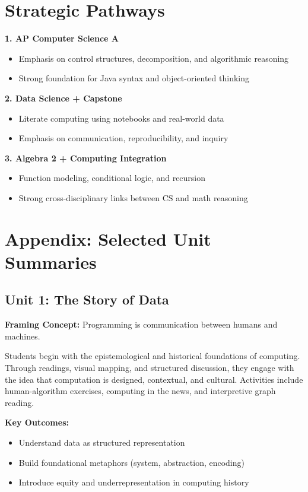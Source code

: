 \documentclass[11pt]{article}
\begin{document}
\section*{Strategic Pathways}
\textbf{1. AP Computer Science A}
\begin{itemize}[leftmargin=*]
  \item Emphasis on control structures, decomposition, and algorithmic reasoning
  \item Strong foundation for Java syntax and object-oriented thinking
\end{itemize}

\textbf{2. Data Science + Capstone}
\begin{itemize}[leftmargin=*]
  \item Literate computing using notebooks and real-world data
  \item Emphasis on communication, reproducibility, and inquiry
\end{itemize}

\textbf{3. Algebra 2 + Computing Integration}
\begin{itemize}[leftmargin=*]
  \item Function modeling, conditional logic, and recursion
  \item Strong cross-disciplinary links between CS and math reasoning
\end{itemize}

\newpage

\section*{Appendix: Selected Unit Summaries}

\subsection*{Unit 1: The Story of Data}
\textbf{Framing Concept:} Programming is communication between humans and machines.

Students begin with the epistemological and historical foundations of computing. Through readings, visual mapping, and structured discussion, they engage with the idea that computation is designed, contextual, and cultural. Activities include human-algorithm exercises, computing in the news, and interpretive graph reading.

\textbf{Key Outcomes:}
\begin{itemize}[leftmargin=*]
  \item Understand data as structured representation
  \item Build foundational metaphors (system, abstraction, encoding)
  \item Introduce equity and underrepresentation in computing history
\end{itemize}
\end{document}

